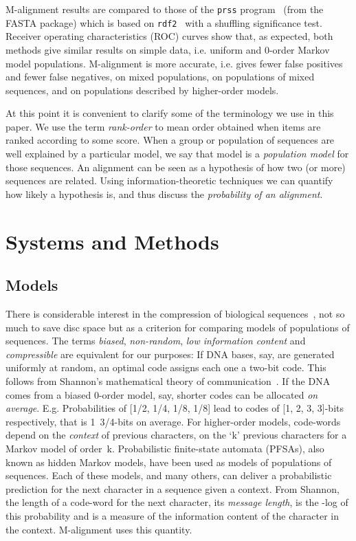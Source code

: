 \documentclass[letterpaper,11pt,oneside]{article}
\begin{document}
\begin{multicols}{2}
M-alignment results are compared to those of
the {\tt prss} program~\cite{smith81} (from the FASTA package) which
is based on {\tt rdf2}~\cite{pearson88} with a shuffling significance test.
Receiver operating characteristics (ROC) curves show that, as expected,
both methods give similar results
on simple data, i.e. uniform and 0-order Markov model populations.
M-alignment is more accurate,
i.e. gives fewer false positives and fewer false negatives,
on mixed populations,
on populations of mixed sequences, and
on populations described by higher-order models.

At this point it is convenient to clarify some of the terminology we use in
this paper.  We use the term {\em rank-order} to mean order obtained when
items are ranked according to some score.  When a group or population of
sequences are well explained by a particular model, we say that model is a
{\em population model} for those sequences.  An alignment can be seen as a
hypothesis of how two (or more) sequences are related.  Using
information-theoretic techniques we can quantify how likely a hypothesis is,
and thus discuss the {\em probability of an alignment}.

\section{Systems and Methods} \label{sec:sys}

\subsection{Models} \label{sec:models}

There is considerable interest in the compression of biological
sequences~\cite{grumbach94,loewenstern96,rivals97,allison00},
not so much to save disc space but
as a criterion for comparing models of populations of sequences.
The terms {\em biased}, {\em non-random}, {\em low information content}
and {\em compressible} are equivalent for our purposes:
If DNA bases, say, are generated uniformly at random, an optimal code
assigns each one a two-bit code.
This follows from
Shannon's mathematical theory of communication~\cite{shannon49}.
If the DNA comes from a biased 0-order model, say,
shorter codes can be allocated {\em on average}.
E.g. Probabilities of [1/2, 1/4, 1/8, 1/8] lead to codes of
[1, 2, 3, 3]-bits respectively, that is 1~3/4-bits on average.
For higher-order models, code-words depend on the {\em context}
of previous characters, on the `k' previous characters
for a Markov model of order~k.
Probabilistic finite-state automata (PFSAs),
also known as hidden Markov models,
have been used as models \cite{georgeff84} of populations of sequences.
Each of these models, and many others, can deliver a probabilistic
prediction for the next character in a sequence given a context.
From Shannon, the length of a code-word for the next character,
its {\em message length}, is the -log of this probability and
is a measure of the information content of the character in the context.
M-alignment uses this quantity.



\end{multicols}
\end{document}
